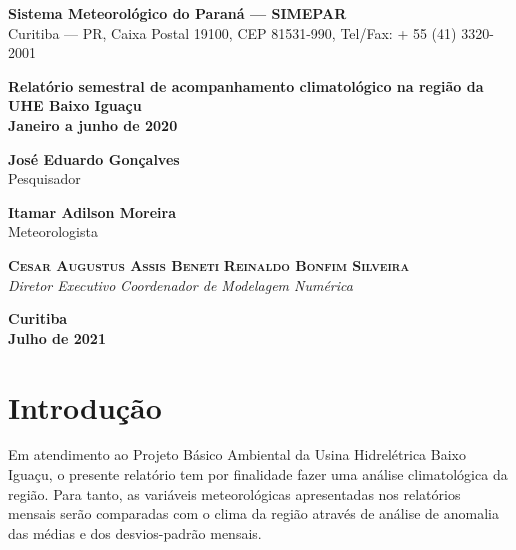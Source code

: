 \documentclass[a4paper,12pt]{article}
\begin{document}
\thispagestyle{empty}

\begin{flushleft}
\textbf{Sistema Meteorológico do Paraná --- SIMEPAR} \\
Curitiba --- PR, Caixa Postal 19100, CEP 81531-990, Tel/Fax: + 55 (41) 3320-2001
\end{flushleft}

\vspace{5.0cm}

\begin{center}
\fontsize{24pt}{28pt}\selectfont
\textbf{Relatório semestral de acompanhamento climatológico na região da UHE Baixo Iguaçu}\\
\vspace{18pt}
\textbf{Janeiro a junho de 2020
}\end{center}

\vspace{4.0cm}

\begin{center}
\textbf{José Eduardo Gonçalves}\\
Pesquisador\\

\vspace{12pt}

\textbf{Itamar Adilson Moreira}\\
Meteorologista\\
\end{center}

\vspace{12pt}

{\raggedleft \textbf{\textsc{Cesar Augustus Assis Beneti}}} \hfill \textsc{\textbf{Reinaldo Bonfim Silveira}}\\
\textit{Diretor Executivo} \hfill \textit{Coordenador de Modelagem Numérica}

\vspace{60pt}

\begin{center}
\textbf{Curitiba} \\
\textbf{Julho de 2021}
\end{center}

\newpage
\section{Introdução}

\hspace{0.5cm}Em atendimento ao Projeto Básico Ambiental da Usina Hidrelétrica Baixo Iguaçu, 
o presente relatório tem por finalidade fazer uma análise climatológica da região. Para tanto, as 
variáveis meteorológicas apresentadas nos relatórios mensais serão comparadas com o clima da região através de 
análise de anomalia das médias e dos desvios-padrão mensais.
\end{document}
